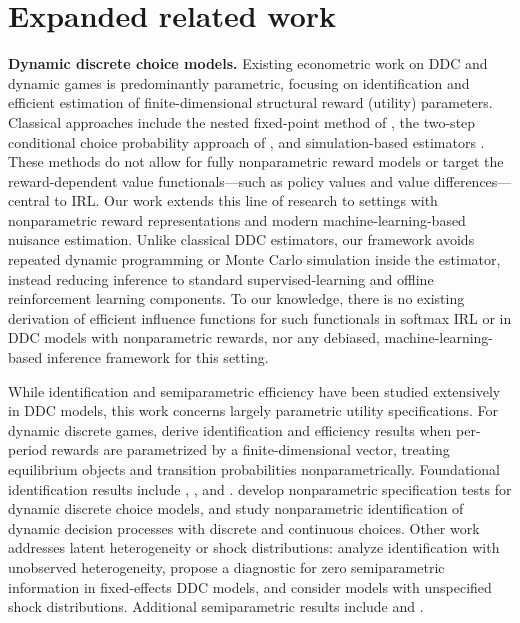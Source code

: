 \documentclass[11pt]{article}
\theoremstyle{plain}
\begin{document}
 
\section{Expanded related work}
\label{app::relatedwork}

 

\noindent \textbf{Dynamic discrete choice models.} Existing econometric work on
DDC and dynamic games is predominantly parametric, focusing on identification
and efficient estimation of finite-dimensional structural reward (utility)
parameters. Classical approaches include the nested fixed-point method of
\citet{rust1987optimal}, the two-step conditional choice probability approach
of \citet{hotz1993conditional}, and simulation-based estimators
\citep{hotz1994simulation,aguirregabiria2010dynamic}. These methods do not
allow for fully nonparametric reward models or target the reward-dependent
value functionals—such as policy values and value differences—central to IRL.
Our work extends this line of research to settings with nonparametric reward
representations and modern machine-learning-based nuisance estimation. Unlike
classical DDC estimators, our framework avoids repeated dynamic programming or
Monte Carlo simulation inside the estimator, instead reducing inference to
standard supervised-learning and offline reinforcement learning components. To
our knowledge, there is no existing derivation of efficient influence functions
for such functionals in softmax IRL or in DDC models with nonparametric
rewards, nor any debiased, machine-learning-based inference framework for this
setting.

While identification and semiparametric efficiency have been studied extensively
in DDC models, this work concerns largely parametric utility specifications. For
dynamic discrete games, \citet{bajari2015dynamic} derive identification and
efficiency results when per-period rewards are parametrized by a
finite-dimensional vector, treating equilibrium objects and transition
probabilities nonparametrically. Foundational identification results include
\citet{hotz1993conditional}, \citet{hotz1994simulation}, and
\citet{magnac2002identifying}. \citet{blundell2007non} develop nonparametric
specification tests for dynamic discrete choice models, and
\citet{blevins2014nonparametric} study nonparametric identification of dynamic
decision processes with discrete and continuous choices. Other work addresses
latent heterogeneity or shock distributions: \citet{kasahara2009nonparametric}
analyze identification with unobserved heterogeneity,
\citet{buchinsky2010semiparametric} propose a diagnostic for zero semiparametric
information in fixed-effects DDC models, and \citet{buchholz2021semiparametric}
consider models with unspecified shock distributions. Additional semiparametric
results include \citet{arcidiacono2011conditional} and \citet{norets2014semiparametric}.
\end{document}
